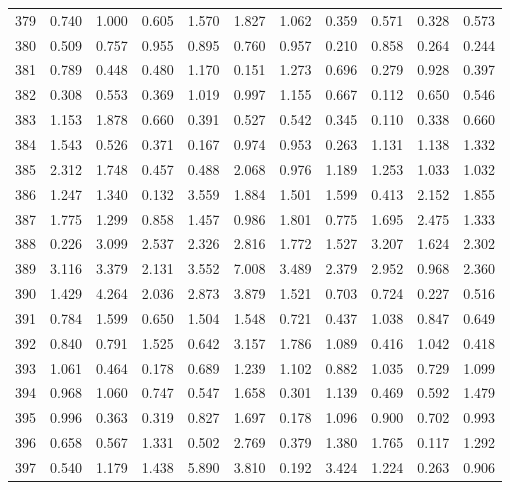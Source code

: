 \begin{tabular}{lrrrrrrrrrr}
379 &  0.740 &  1.000 &  0.605 &  1.570 &  1.827 &  1.062 &  0.359 &  0.571 &  0.328 &  0.573 \\
380 &  0.509 &  0.757 &  0.955 &  0.895 &  0.760 &  0.957 &  0.210 &  0.858 &  0.264 &  0.244 \\
381 &  0.789 &  0.448 &  0.480 &  1.170 &  0.151 &  1.273 &  0.696 &  0.279 &  0.928 &  0.397 \\
382 &  0.308 &  0.553 &  0.369 &  1.019 &  0.997 &  1.155 &  0.667 &  0.112 &  0.650 &  0.546 \\
383 &  1.153 &  1.878 &  0.660 &  0.391 &  0.527 &  0.542 &  0.345 &  0.110 &  0.338 &  0.660 \\
384 &  1.543 &  0.526 &  0.371 &  0.167 &  0.974 &  0.953 &  0.263 &  1.131 &  1.138 &  1.332 \\
385 &  2.312 &  1.748 &  0.457 &  0.488 &  2.068 &  0.976 &  1.189 &  1.253 &  1.033 &  1.032 \\
386 &  1.247 &  1.340 &  0.132 &  3.559 &  1.884 &  1.501 &  1.599 &  0.413 &  2.152 &  1.855 \\
387 &  1.775 &  1.299 &  0.858 &  1.457 &  0.986 &  1.801 &  0.775 &  1.695 &  2.475 &  1.333 \\
388 &  0.226 &  3.099 &  2.537 &  2.326 &  2.816 &  1.772 &  1.527 &  3.207 &  1.624 &  2.302 \\
389 &  3.116 &  3.379 &  2.131 &  3.552 &  7.008 &  3.489 &  2.379 &  2.952 &  0.968 &  2.360 \\
390 &  1.429 &  4.264 &  2.036 &  2.873 &  3.879 &  1.521 &  0.703 &  0.724 &  0.227 &  0.516 \\
391 &  0.784 &  1.599 &  0.650 &  1.504 &  1.548 &  0.721 &  0.437 &  1.038 &  0.847 &  0.649 \\
392 &  0.840 &  0.791 &  1.525 &  0.642 &  3.157 &  1.786 &  1.089 &  0.416 &  1.042 &  0.418 \\
393 &  1.061 &  0.464 &  0.178 &  0.689 &  1.239 &  1.102 &  0.882 &  1.035 &  0.729 &  1.099 \\
394 &  0.968 &  1.060 &  0.747 &  0.547 &  1.658 &  0.301 &  1.139 &  0.469 &  0.592 &  1.479 \\
395 &  0.996 &  0.363 &  0.319 &  0.827 &  1.697 &  0.178 &  1.096 &  0.900 &  0.702 &  0.993 \\
396 &  0.658 &  0.567 &  1.331 &  0.502 &  2.769 &  0.379 &  1.380 &  1.765 &  0.117 &  1.292 \\
397 &  0.540 &  1.179 &  1.438 &  5.890 &  3.810 &  0.192 &  3.424 &  1.224 &  0.263 &  0.906 \\

\end{tabular}
